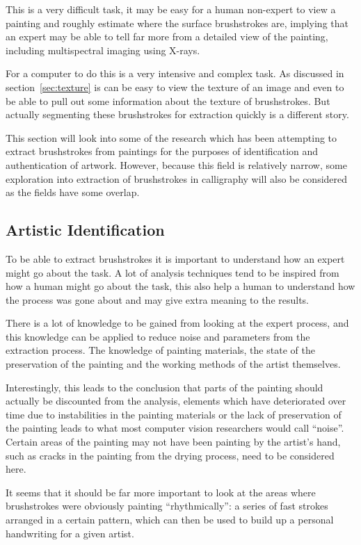 \documentclass[conference]{IEEEtran}
\begin{document}
This is a very difficult task, it may be easy for a human non-expert to view a
painting and roughly estimate where the surface brushstrokes are, implying that
an expert may be able to tell far more from a detailed view of the painting,
including multispectral imaging using X-rays.

For a computer to do this is a very intensive and complex task. As discussed
in section~\ref{sec:texture} is can be easy to view the texture of an image and
even to be able to pull out some information about the texture of brushstrokes.
But actually segmenting these brushstrokes for extraction quickly is a
different story.

This section will look into some of the research which has been attempting to
extract brushstrokes from paintings for the purposes of identification and
authentication of artwork. However, because this field is relatively narrow,
some exploration into extraction of brushstrokes in calligraphy will also be
considered as the fields have some overlap.

\subsection{Artistic Identification}

To be able to extract brushstrokes it is important to understand how an expert
might go about the task. A lot of analysis techniques tend to be inspired from
how a human might go about the task, this also help a human to understand how
the process was gone about and may give extra meaning to the results.

There is a lot of knowledge to be gained from looking at the expert process,
and this knowledge can be applied to reduce noise and parameters from the
extraction process. The knowledge of painting materials, the state of the
preservation of the painting and the working methods of the artist themselves.

Interestingly, this leads to the conclusion that parts of the painting should
actually be discounted from the analysis, elements which have deteriorated over
time due to instabilities in the painting materials or the lack of preservation
of the painting leads to what most computer vision researchers would call
``noise''. Certain areas of the painting may not have been painting by the
artist's hand, such as cracks in the painting from the drying process, need to
be considered here.

It seems that it should be far more important to look at the areas where
brushstrokes were obviously painting ``rhythmically'': a series of fast strokes
arranged in a certain pattern, which can then be used to build up a personal
handwriting for a given artist\cite{johnson08image}.
\end{document}
